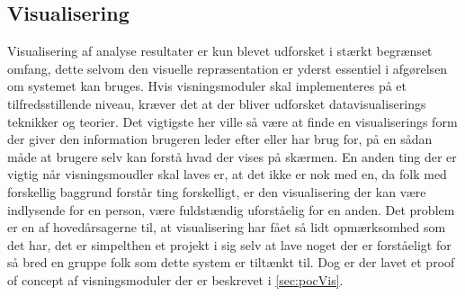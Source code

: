 \subsection{Visualisering}\label{sec:soevnVisVidArb}
Visualisering af analyse resultater er kun blevet udforsket i stærkt begrænset omfang, dette selvom den visuelle repræsentation er yderst essentiel i afgørelsen om systemet kan bruges.
Hvis visningsmoduler skal implementeres på et tilfredsstillende niveau, kræver det at der bliver udforsket datavisualiserings teknikker og teorier.
Det vigtigste her ville så være at finde en visualiserings form der giver den information brugeren leder efter eller har brug for, på en sådan måde at brugere selv kan forstå hvad der vises på skærmen.
En anden ting der er vigtig når visningsmoudler skal laves er, at det ikke er nok med en, da folk med forskellig baggrund forstår ting forskelligt, er den visualisering der kan være indlysende for en person, være fuldstændig uforståelig for en anden.
Det problem er en af hovedårsagerne til, at visualisering har fået så lidt opmærksomhed som det har, det er simpelthen et projekt i sig selv at lave noget der er forståeligt for så bred en gruppe folk som dette system er tiltænkt til.
Dog er der lavet et proof of concept af visningsmoduler der er beskrevet i \cref{sec:pocVis}.